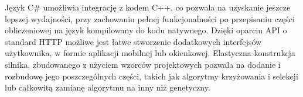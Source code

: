 Język C\# umożliwia integrację z kodem C++, co pozwala na uzyskanie jeszcze lepszej wydajności, przy zachowaniu pełnej funkcjonalności po przepisaniu części obliczeniowej na język kompilowany do kodu natywnego.
Dzięki oparciu API o standard HTTP możliwe jest łatwe stworzenie dodatkowych interfejsów użytkownika, w formie aplikacji mobilnej lub okienkowej.
Elastyczna konstrukcja silnika, zbudowanego z użyciem wzorców projektowych pozwala na dodanie i rozbudowę jego poszczególnych części, takich jak algorytmy krzyżowania i selekcji lub całkowitą zamianę algorytmu na inny niż genetyczny.
